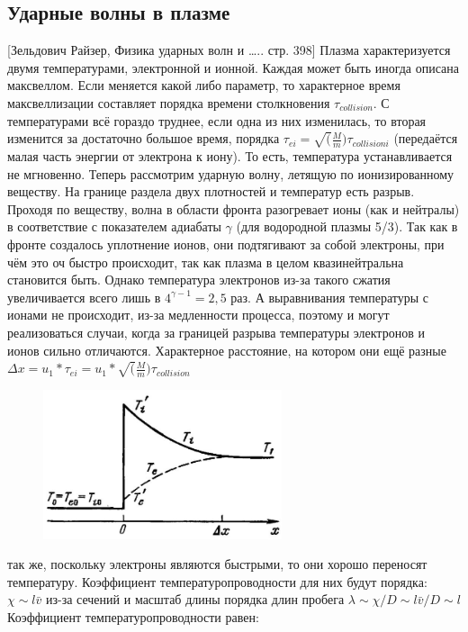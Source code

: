 \documentclass[10pt, a4paper]{article}
\numberwithin{equation}{section}
\begin{document}
\subsection{Ударные волны в плазме}
\label{131}
[Зельдович Райзер, Физика ударных волн и ….. стр. 398]
Плазма характеризуется двумя температурами, электронной и ионной. Каждая может быть иногда описана максвеллом. Если меняется какой либо параметр, то характерное время максвеллизации составляет порядка времени столкновения $\tau_{collision}$. С температурами всё гораздо труднее, если одна из них изменилась, то вторая изменится за достаточно большое время, порядка $\tau_{ei}=\sqrt(\frac{M}{m}) \tau_{collision i}$ (передаётся малая часть энергии от электрона к иону). То есть, температура устанавливается не мгновенно.
Теперь рассмотрим ударную волну, летящую по ионизированному веществу.
На границе раздела двух плотностей и температур есть разрыв. Проходя по веществу, волна в области фронта разогревает ионы (как и нейтралы) в соответствие с показателем адиабаты $\gamma$ (для водородной плазмы 5/3). Так как в фронте создалось уплотнение ионов, они подтягивают за собой электроны, при чём это оч быстро происходит, так как плазма в целом квазинейтральна становится быть. Однако температура электронов из-за такого сжатия увеличивается всего лишь в $4^{\gamma - 1}=2,5$ раз. А выравнивания температуры с ионами не происходит, из-за медленности процесса, поэтому и могут реализоваться случаи, когда за границей разрыва температуры электронов и ионов сильно отличаются. Характерное расстояние, на котором они ещё разные $\Delta x = u_1*\tau_{ei} =u_1* \sqrt(\frac{M}{m}) \tau_{collision}$
\begin{figure}[h!]
	{\includegraphics[width=70mm]{13. Skach plotn.JPG}}
\end{figure}
так же, поскольку электроны являются быстрыми, то они хорошо переносят температуру. Коэффициент температуропроводности для них будут порядка: $\chi \sim l\bar{v}$ из-за сечений и масштаб длины порядка длин пробега $\lambda \sim \chi /D \sim l \bar{v}/D \sim l$
Коэффициент температуропроводности равен:
\end{document}
